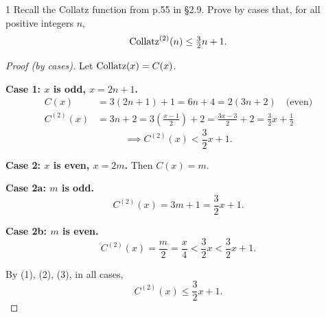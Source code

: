 
\begin{exercise}{1}
    Recall the Collatz function from p.55 in \S2.9. Prove by cases that, for all
    positive integers $n$,
    \[
        \operatorname{Collatz}^{(2)}(n) \le \tfrac32 n + 1.
    \]
\end{exercise}
\begin{solbox}
\begin{proof}[Proof (by cases)]
    Let $\operatorname{Collatz}(x) = C(x)$.

    \textbf{Case 1: $x$ is odd, $x=2n+1$.}
    \begin{align*}
        C(x) &= 3(2n+1)+1 = 6n+4 = 2(3n+2) \quad \text{(even)} \\
        C^{(2)}(x) &= 3n+2 = 3\left(\frac{x-1}{2}\right)+2
            = \frac{3x-3}{2}+2 = \frac{3}{2}x+\frac12
    \end{align*}
    \[
        \implies C^{(2)}(x) < \frac32 x+1. \tag{1}
    \]

    \textbf{Case 2: $x$ is even, $x=2m$.} Then $C(x)=m$.

    \textbf{Case 2a: $m$ is odd.}
    \[
        C^{(2)}(x) = 3m+1 = \frac32 x+1. \tag{2}
    \]

    \textbf{Case 2b: $m$ is even.}
    \[
        C^{(2)}(x) = \frac{m}{2} = \frac{x}{4}
            < \frac32 x < \frac32 x+1. \tag{3}
    \]

    By (1), (2), (3), in all cases,
    \[
        C^{(2)}(x) \le \frac32 x+1.
    \]
\end{proof}
\end{solbox}

